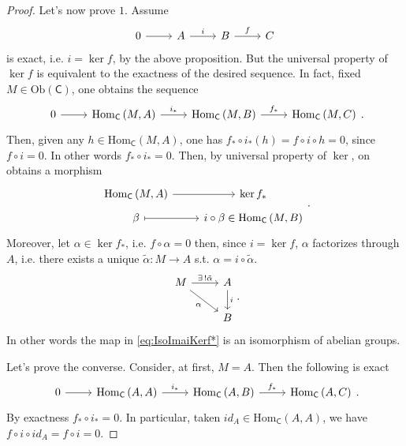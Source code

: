 \documentclass[../Main]{subfiles}
\begin{document}
\begin{proof}
	Let's now prove $1$.
	Assume 
	\begin{equation}
		\begin{tikzcd}
		0 \arrow[r, "", rightarrow] &
		A \arrow[r, "i", rightarrow] &
		B \arrow[r, "f", rightarrow] &
		C
		\end{tikzcd}
	\end{equation} 
	is exact, i.e. $i = \ker f$, by the above proposition.
	But the universal property of $\ker f$ is equivalent to the exactness of the desired
	sequence.
	In fact, fixed $M \in \mathrm{Ob} \left(\mathsf{C}\right)$, one obtains the sequence
	\begin{equation}
	\begin{tikzcd}
		0 \arrow[r, "", rightarrow] &
		\mathrm{Hom}_{\mathsf{C}} \left( M, A \right) \arrow[r, "i_*", rightarrow] &
		\mathrm{Hom}_{\mathsf{C}} \left( M, B \right) \arrow[r, "f_*", rightarrow] &
		\mathrm{Hom}_{\mathsf{C}} \left( M, C \right)
	\end{tikzcd}
	.\end{equation} 
	Then, given any $h \in \mathrm{Hom}_{\mathsf{C}} \left( M, A \right)$, one
	has $f_* \circ i_* (h) = f \circ i \circ h = 0$, since $f \circ i = 0$.
	In other words $f _* \circ i_* = 0$.
	Then, by universal property of $\ker$, on obtains a morphism
	\begin{equation}\label{eq:IsoImaiKerf*}
	\begin{tikzcd}[row sep=tiny]
		\mathrm{Hom}_{\mathsf{C}} \left( M, A \right) \arrow[r, "", rightarrow] &
		\ker f_*\\
		\beta \arrow[r, "", mapsto] &
		i \circ \beta \in \mathrm{Hom}_{\mathsf{C}} \left( M, B \right)
	\end{tikzcd}
	.\end{equation} 
	Moreover, let $\alpha \in \ker f_*$, i.e. $f \circ \alpha = 0$
	then, since $i = \ker f$, $\alpha$ factorizes through $A$,
	i.e. there exists a unique $\tilde{\alpha}\colon M \to A$
	s.t. $\alpha = i \circ \tilde{\alpha}$.
	\begin{equation}
	\begin{tikzcd}
		M \arrow[r, "\exists\, ! \tilde{\alpha}", rightarrow] 
		\arrow[rd, "\alpha"', rightarrow] &
		A \arrow[d, "i", rightarrow] \\
		&
		B
	\end{tikzcd}
	.\end{equation} 
	In other words the map in \eqref{eq:IsoImaiKerf*} is an isomorphism of abelian groups.

	Let's prove the converse.
	Consider, at first, $M = A$. Then the following is exact
	\begin{equation}
	\begin{tikzcd}
		0 \arrow[r, "", rightarrow] &
		\mathrm{Hom}_{\mathsf{C}} \left( A, A \right) \arrow[r, "i_*", rightarrow] &
		\mathrm{Hom}_{\mathsf{C}} \left( A, B \right) \arrow[r, "f_*", rightarrow] &
		\mathrm{Hom}_{\mathsf{C}} \left( A, C \right)
	\end{tikzcd}
	.\end{equation} 
	By exactness $f_* \circ i_* = 0$.
	In particular, taken $id_A \in \mathrm{Hom}_{\mathsf{C}} \left( A, A \right)$,
	we have $f \circ i \circ id_A = f \circ i = 0$.


\end{proof}
\end{document}
